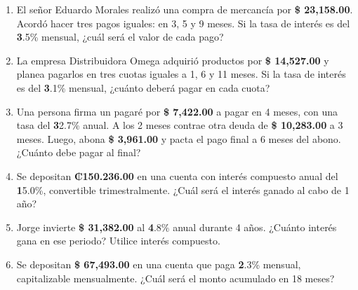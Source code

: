 \documentclass[14pt]{article}
\begin{document}
\begin{enumerate}
  \item El señor Eduardo Morales realizó una compra de mercancía por \textbf{\$ 23,158.00}. Acordó hacer tres pagos iguales: en 3, 5 y 9 meses. Si la tasa de interés es del \textbf3.5\% mensual, ¿cuál será el valor de cada pago?

  \item La empresa Distribuidora Omega adquirió productos por \textbf{\$ 14,527.00} y planea pagarlos en tres cuotas iguales a 1, 6 y 11 meses. Si la tasa de interés es del \textbf3.1\% mensual, ¿cuánto deberá pagar en cada cuota?

  \item Una persona firma un pagaré por \textbf{\$ 7,422.00} a pagar en 4 meses, con una tasa del \textbf32.7\% anual. A los 2 meses contrae otra deuda de \textbf{\$ 10,283.00} a 3 meses. Luego, abona \textbf{\$ 3,961.00} y pacta el pago final a 6 meses del abono. ¿Cuánto debe pagar al final?

  \item Se depositan \textbf{₡150.236.00} en una cuenta con interés compuesto anual del \textbf15.0\%, convertible trimestralmente. ¿Cuál será el interés ganado al cabo de 1 año?

  \item Jorge invierte \textbf{\$ 31,382.00} al \textbf4.8\% anual durante 4 años. ¿Cuánto interés gana en ese periodo? Utilice interés compuesto.

  \item Se depositan \textbf{\$ 67,493.00} en una cuenta que paga \textbf2.3\% mensual, capitalizable mensualmente. ¿Cuál será el monto acumulado en 18 meses?
\end{enumerate}
\newpage
\end{document}
